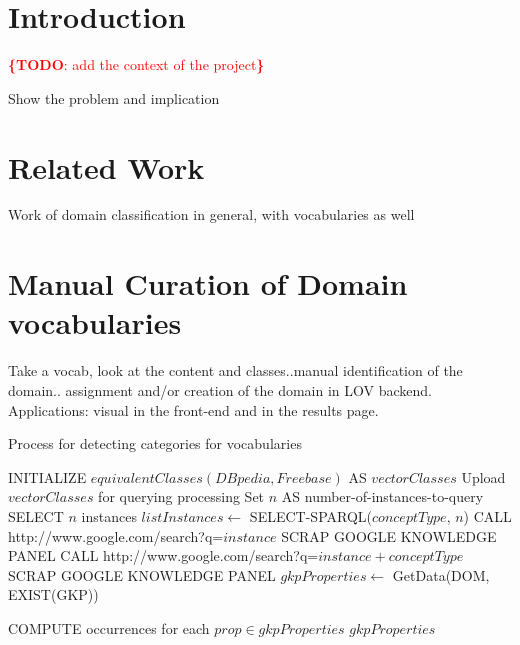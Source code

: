 \documentclass[runningheads,a4paper]{llncs}
\newcommand{\todo}[1]{\noindent\textcolor{red}{{\bf \{TODO}: #1{\bf \}}}}
\begin{document}



\section{Introduction}
\label{sec:introduction}

\todo{add the context of the project}



Show the problem and implication

\section{Related Work}
\label{sec:soa}

Work of domain classification in general, with vocabularies as well \\

\section{Manual Curation of Domain vocabularies}
\label{sec:curation}

Take a vocab, look at the content and classes..manual identification of the domain.. assignment and/or creation of the domain in LOV backend. Applications: visual in the front-end and in the results page. 

\begin{algorithm}[h]\scriptsize
\caption{Process for detecting categories for vocabularies} \label{experiment}
\begin{algorithmic}[1]
    \STATE INITIALIZE $equivalentClasses(DBpedia,Freebase) $ AS $vectorClasses$
    \STATE Upload $vectorClasses$ for querying processing
    \STATE Set $n$ AS number-of-instances-to-query
	\STATE SELECT $n$ instances
	\STATE $listInstances \leftarrow$ SELECT-SPARQL($conceptType$, $n$)
			\STATE CALL http://www.google.com/search?q=$instance$
				\STATE SCRAP GOOGLE KNOWLEDGE PANEL
			\ELSE
				\STATE CALL http://www.google.com/search?q=$instance + conceptType$
 				\STATE SCRAP GOOGLE KNOWLEDGE PANEL
			\ENDIF
			\STATE $gkpProperties \leftarrow$ GetData(DOM, EXIST(GKP))
			
		\ENDFOR
	\STATE COMPUTE occurrences for each $prop \in gkpProperties$
    \ENDFOR
    \RETURN $gkpProperties$
\end{algorithmic}
\end{algorithm}
\end{document}
